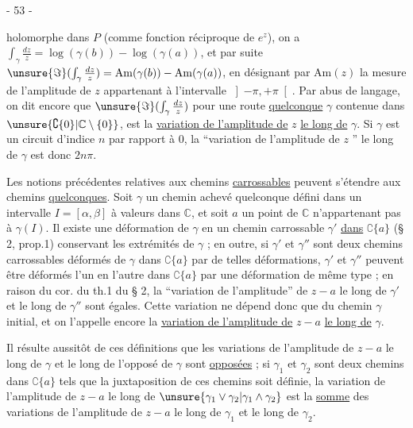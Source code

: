 \begin{center}- 53 -\end{center}
holomorphe dans $P$ (comme fonction réciproque de $e^z$), on a $\int_\gamma\frac{dz}{z}=\log(\gamma(b))-\log(\gamma(a))$, et par suite $\unsure{\Im}(\int_\gamma\frac{dz}{z})=\mathrm{Am}(\gamma(b))-\mathrm{Am}(\gamma(a))$, en désignant par $\mathrm{Am}(z)$ la mesure de l'amplitude de $z$ appartenant à l'intervalle $\left]-\pi,+\pi\right[$. Par abus de langage, on dit encore que $\unsure{\Im}(\int_\gamma\frac{dz}{z})$ pour une route \uline{quelconque} $\gamma$ contenue dans $\unsure{\complement\{0\}|\mathbb C\setminus\{0\}}$, est la \uline{variation de l'amplitude de} $z$ \uline{le long de} $\gamma$. Si $\gamma$ est un circuit d'indice $n$ par rapport à $0$, la ``variation de l'amplitude de $z$ '' le long de $\gamma$ est donc $2n\pi$.

Les notions précédentes relatives aux chemins \uline{carrossables} peuvent s'étendre aux chemins \uline{quelconques}. Soit $\gamma$ un chemin achevé quelconque défini dans un intervalle $I=[\alpha,\beta]$ à valeurs dans $\mathbb C$, et soit $a$ un point de $\mathbb C$ n'appartenant pas à $\gamma(I)$. Il existe une déformation de $\gamma$ en un chemin carrossable $\gamma'$ \uline{dans} $\complement\{a\}$ (§ 2, prop.1) conservant les extrémités de $\gamma$ ; en outre, si $\gamma'$ et $\gamma''$ sont deux chemins carrossables déformés de $\gamma$ dans $\complement\{a\}$ par de telles déformations, $\gamma'$ et $\gamma''$ peuvent être déformés l'un en l'autre dans $\complement\{a\}$ par une déformation de même type ; en raison du cor. du th.1 du § 2, la ``variation de l'amplitude'' de $z-a$ le long de $\gamma'$ et le long de $\gamma''$ sont égales. Cette variation ne dépend donc que du chemin $\gamma$ initial, et on l'appelle encore la \uline{variation de l'amplitude de} $z-a$ \uline{le long de} $\gamma$.

Il résulte aussitôt de ces définitions que les variations de l'amplitude de $z-a$ le long de $\gamma$ et le long de l'opposé de $\gamma$ sont \uline{opposées} ; si $\gamma_1$ et $\gamma_2$ sont deux chemins dans $\complement\{a\}$ tels que la juxtaposition de ces chemins soit définie, la variation de l'amplitude de $z-a$ le long de $\unsure{\gamma_1\vee\gamma_2|\gamma_1\wedge\gamma_2}$ est la \uline{somme} des variations de l'amplitude de $z-a$ le long de $\gamma_1$ et le long de $\gamma_2$.
